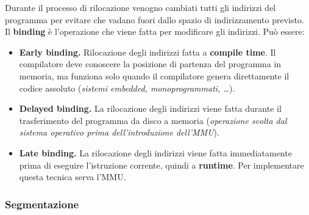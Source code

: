 \documentclass[12pt, letterpaper]{article}
\begin{document}
				Durante il processo di rilocazione venogno cambiati tutti gli indirizzi del programma per evitare che vadano fuori dallo spazio di indirizzamento previsto. Il \textbf{binding} è l'operazione che viene fatta per modificare gli indirizzi. Può essere: 
				\begin{itemize}
					\item \textbf{Early binding.} Rilocazione degli indirizzi fatta a \textbf{compile time}. Il compilatore deve conoscere la posizione di partenza del programma in memoria, ma funziona solo quando il compilatore genera direttamente il codice assoluto (\textit{sistemi embedded, monoprogrammati, \dots}).
					\item \textbf{Delayed binding.} La rilocazione degli indirizzi viene fatta durante il trasferimento del programma da disco a memoria (\textit{operazione svolta dal sistema operativo prima dell'introduzione dell'MMU}).
					\item \textbf{Late binding.} La rilocazione degli indirizzi viene fatta immediatamente prima di eseguire l'istruzione corrente, quindi a \textbf{runtime}. Per implementare questa tecnica serva l'MMU. 
				\end{itemize}
				
			\subsubsection{Segmentazione}
				
\end{document}

